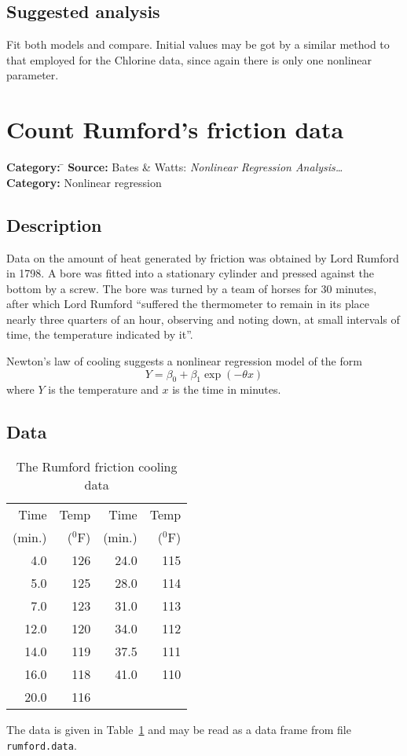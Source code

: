 \documentclass{article}
\newcommand{\strutt}{\vrule height 2.5ex depth 0.5ex width 0ex}%
\newcommand{\code}[1]{\texttt{#1}}
\begin{document}
\subsection*{Suggested analysis}
Fit both models and compare.  Initial values may be got by a similar method
to that employed for the Chlorine data, since again there is only one
nonlinear parameter.

\clearpage\section{Count Rumford's friction data}
\begin{tabbing}
\textbf{Category:} \= \kill
\textbf{Source:} \> Bates \& Watts: \textit{Nonlinear Regression Analysis\ldots}\\
\textbf{Category:} \> Nonlinear regression
\end{tabbing}

\subsection*{Description}
Data on the amount of heat generated by friction was obtained by Lord
Rumford in 1798.  A bore was fitted into a stationary cylinder and pressed
against the bottom by a screw.  The bore was turned by a team of horses
for 30 minutes, after which Lord Rumford ``suffered the thermometer to
remain in its place nearly three quarters of an hour, observing and noting
down, at small intervals of time, the temperature indicated by it''.

Newton's law of cooling suggests a nonlinear regression model of
the form
\[
Y = \beta_0 + \beta_1\exp(-\theta x)
\]
where $Y$ is the temperature and $x$ is the time in minutes.

\subsection*{Data}

\begin{table}[ht]
\begin{center}
\begin{tabular}{@{\protect\strutt}|*{2}{rr|}}
\hline
 Time  & Temp    &   Time &  Temp  \\
(min.) & ($^0$F) & (min.) & ($^0$F) \\
\hline
  4.0  &  126    &   24.0 & 115 \\
  5.0  &  125    &   28.0 & 114 \\
  7.0  &  123    &   31.0 & 113 \\
 12.0  &  120    &   34.0 & 112 \\
 14.0  &  119    &   37.5 & 111 \\
 16.0  &  118    &   41.0 & 110 \\
 20.0  &  116 & & \\
\hline
\end{tabular}
\end{center}
\caption{\label{rumford} The Rumford friction cooling data}
\end{table}
The data is given in Table~\ref{rumford} and may be read as a data frame from
file \code{rumford.data}.
\end{document}
